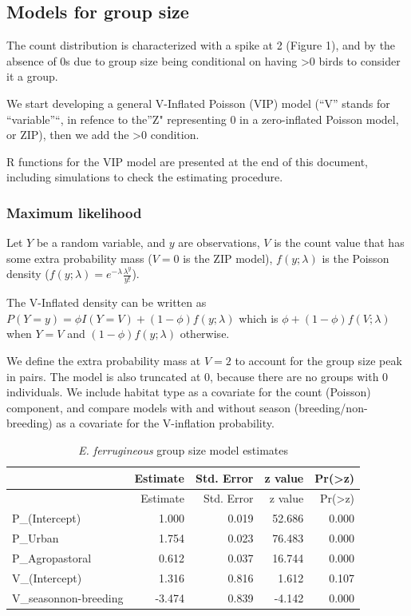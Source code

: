 \documentclass[]{article}
\begin{document}
\subsection{Models for group size}\label{models-for-group-size}

The count distribution is characterized with a spike at 2 (Figure 1),
and by the absence of 0s due to group size being conditional on having
\textgreater{}0 birds to consider it a group.

We start developing a general V-Inflated Poisson (VIP) model (``V''
stands for ``variable''``, in refence to the''Z" representing 0 in a
zero-inflated Poisson model, or ZIP), then we add the \textgreater{}0
condition.

R functions for the VIP model are presented at the end of this document,
including simulations to check the estimating procedure.

\subsubsection{Maximum likelihood}\label{maximum-likelihood}

Let \(Y\) be a random variable, and \(y\) are observations, \(V\) is the
count value that has some extra probability mass (\(V=0\) is the ZIP
model), \(f(y; \lambda)\) is the Poisson density
(\(f(y; \lambda) = e^{-\lambda} \frac{\lambda^{y}}{y!}\)).

The V-Inflated density can be written as
\(P(Y=y) = \phi I(Y=V) + (1-\phi) f(y; \lambda)\) which is
\(\phi + (1-\phi) f(V; \lambda)\) when \(Y=V\) and
\((1-\phi) f(y; \lambda)\) otherwise.

We define the extra probability mass at \(V=2\) to account for the group
size peak in pairs. The model is also truncated at 0, because there are
no groups with 0 individuals. We include habitat type as a covariate for
the count (Poisson) component, and compare models with and without
season (breeding/non-breeding) as a covariate for the V-inflation
probability.

\begin{longtable}[]{@{}lrrrr@{}}
\caption{\textit{E. ferrugineous} group size model
estimates}\tabularnewline
\toprule
& Estimate & Std. Error & z value &
Pr(\textgreater{}\textbar{}z\textbar{})\tabularnewline
\midrule
\endfirsthead
\toprule
& Estimate & Std. Error & z value &
Pr(\textgreater{}\textbar{}z\textbar{})\tabularnewline
\midrule
\endhead
P\_(Intercept) & 1.000 & 0.019 & 52.686 & 0.000\tabularnewline
P\_Urban & 1.754 & 0.023 & 76.483 & 0.000\tabularnewline
P\_Agropastoral & 0.612 & 0.037 & 16.744 & 0.000\tabularnewline
V\_(Intercept) & 1.316 & 0.816 & 1.612 & 0.107\tabularnewline
V\_seasonnon-breeding & -3.474 & 0.839 & -4.142 & 0.000\tabularnewline
\bottomrule
\end{longtable}
\end{document}
